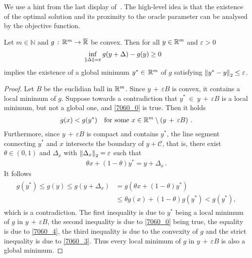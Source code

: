 We use a hint from the last display of~\cite[p.22]{Wang2019}.
The high-level idea is that the existence of the optimal solution and its proximity to the oracle parameter can be analysed by the objective function.
\begin{lemma}
  \label{bw:cd:lem}
  Let $m\in\mathbb{N}$ and
  $g \,:\, \mathbb{R}^m \to \overline{\mathbb{R}}$ 
  be convex.
  Then 
  for all $y \in \mathbb{R}^m$ and $\varepsilon>0$ 
    \begin{gather}
      \label{7060_0}
      \inf_{\left\lVert\Delta\right\rVert=\varepsilon} g(y+\Delta) - g(y) \ge 0 \quad
    \end{gather}
    implies
    the existence of  
    a global minimum
    $
    y^* \in \,\mathbb{R}^m
    $
    of $g$
    satisfying
    $
      \left\lVert y^* - y\right\rVert_2 \le \varepsilon
    $.
\end{lemma}
\begin{proof}
  Let $B$ be the euclidian ball in $\mathbb{R}^m$.
  Since 
  $
  y
  \,
  +
  \,
  \varepsilon
  B
  $
  is convex, it contains a 
  local minimum  
  of $g$.
  Suppose towards a contradiction that
  $
    y^* 
    \ 
    \in 
    \ 
  y
  \,
  +
  \,
  \varepsilon
  B
  $
  is a local minimum, but not a global one, and
  \eqref{7060_0} is true.
  Then it holds
  \begin{gather}
    \label{7060_3}
    g(x) < g(y^*)
    \quad
    \text{for some}\ 
    x 
    \in 
    \R^m 
    \setminus 
    \left( 
  y
  \,
  +
  \,
  \varepsilon
  B
    \right)
  \,.
  \end{gather}
  Furthermore, since 
  $
  y
  \,
  +
  \,
  \varepsilon
  B
  $ is compact and contains $y^*$,
  the line segment connecting 
  $y^*$ and $x$
  intersects the boundary of 
  $y + \mathcal{C}$, that is,
  there exist
  $
    \theta \in (0,1)
  $
  and 
  $
    \Delta_x
  $
  with 
  $
    \left\lVert\Delta_x\right\rVert_2=\varepsilon
  $
  such that
  \begin{gather}
    \label{7060_4}
    \theta x + (1 - \theta) y^* = y + \Delta_x
    \,.
  \end{gather}
    It follows
    \begin{align}
      \label{7060_5}
      \begin{split}
      g(y^*)
      \le
      g(y)
      \le
      g(y + \Delta_x)
      &=
      g(
        \theta x + (1 - \theta) y^*
      )
      \\
      &\le
      \theta g(x)
      + 
      (1 - \theta)
      g(y^*)
      <
      g(y^*)
      ,
      \end{split}
    \end{align}
    which is a contradiction.
    The first inequality is due to
    $y^*$ being a local minimum of $g$ in
    $
  y
  \,
  +
  \,
  \varepsilon
  B
    $,
    the second inequality is due to  
    \eqref{7060_0} being true,
    the equality is due to \eqref{7060_4},
    the third inequality is due to the convexity of $g$
    and the strict inequality is due to \eqref{7060_3}.
    Thus every local minimum of $g$ in
    $
  y
  \,
  +
  \,
  \varepsilon
  B
    $
    is also a global minimum.
\end{proof}
